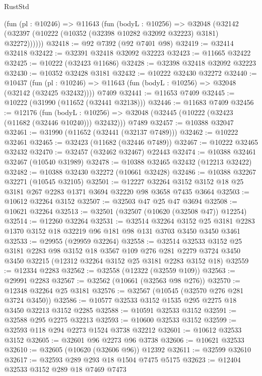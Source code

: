 \begin{lexlean}{RustStd}
\begin{coremodule}
      (fun (pl : @10246) =>
      @11643
        (fun (bodyL : @10256) =>
        @32048 (@32142 (@32397 (@10222 (@10352 (@32398 @10282 @32092 @32223) @3181) @32272))))))
@32418 := @92 @7392 (@92 @7401 @98)
@32419 := @32414 @32418
@32422 := @32391 @32418 @32092 @32223
@32423 := @11665 @32422
@32425 := @10222 (@32423 @11686)
@32428 := @32398 @32418 @32092 @32223
@32430 := @10352 @32428 @3181
@32432 := @10222 @32430 @32272
@32440 := @10437
    (fun (pl : @10246) => @11643 (fun (bodyL : @10256) => @32048 (@32142 (@32425 @32432))))
    @7409
@32441 := @11653 @7409
@32445 := @10222 (@31990 (@11652 (@32441 @32138)))
@32446 := @11683 @7409
@32456 := @12176
    (fun (bodyL : @10256) => @32048 (@32445 (@10222 (@32423 (@11682 (@32446 @10240))) @32432)))
    @7489
@32457 := @10388 @32047
@32461 := @31990 (@11652 (@32441 (@32137 @7489)))
@32462 := @10222 @32461
@32465 := @32423 (@11682 (@32446 @7489))
@32467 := @10222 @32465 @32432
@32470 := @32457 (@32462 @32467) @22443
@32474 := @10388 @32461 @32467 (@10540 @31989)
@32478 := @10388 @32465 @32432 (@12213 @32422)
@32482 := @10388 @32430 @32272 (@10661 @32428)
@32486 := @10388 @32267 @32271 (@10545 @32105)
@32501 := @12227
    @32264
    @3152
    @3152
    @18
    @25
    @3181
    @267
    @2283
    @1371
    @3694
    @32220
    @98
    @3658
    @7435
    @3664
@32503 := @10612 @32264 @3152
@32507 := @32503 @47 @25 @47 @3694
@32508 := @10621 @32264
@32513 := @32501 (@32507 (@10620 (@32508 @47)) @12254)
@32514 := @12260 @32264
@32531 := @32514
    @32264
    @3152
    @25
    @3181
    @2283
    @1370
    @3152
    @18
    @32219
    @96
    @181
    @98
    @131
    @3703
    @3450
    @3450
    @3461
@32533 := @29955 (@29959 @32264)
@32558 := @32514
    @32533
    @3152
    @25
    @3181
    @2283
    @98
    @3152
    @18
    @3567
    @109
    @276
    @281
    @2279
    @3724
    @3450
    @3450
    @32215
    (@12312 @32264 @3152 @25 @3181 @2283 @3152 @18)
@32559 := @12334 @2283
@32562 := @32558 (@12322 (@32559 @109))
@32563 := @29991 @2283
@32567 := @32562 (@10661 (@32563 @98 @276))
@32570 := @12348 @32264 @25 @3181
@32576 := @32567 (@10545 (@32570 @276 @281 @3724 @3450))
@32586 := @10577 @32533 @3152 @1535 @295 @2275 @18 @3450 @32213 @3152 @2285
@32588 := @10591 @32533 @3152
@32591 := @32588 @295 @2275 @32213
@32593 := @10600 @32533 @3152
@32599 := @32593 @118 @294 @2273 @1524 @3738 @32212
@32601 := @10612 @32533 @3152
@32605 := @32601 @96 @2273 @96 @3738
@32606 := @10621 @32533
@32610 := @32605 (@10620 (@32606 @96)) @12392
@32611 := @32599 @32610
@32617 := @32593 @289 @293 @18 @1504 @7475 @5175
@32623 := @12404 @32533 @3152 @289 @18 @7469 @7473

\end{coremodule}
\end{lexlean}
